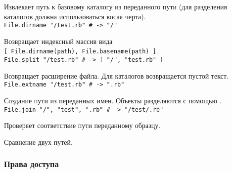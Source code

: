 \begin{methodlist}
  Извлекает путь к базовому каталогу из переданного пути (для разделения каталогов должна использоваться косая черта). 
  \\\verb!File.dirname "/test.rb" # -> "/"!

  Возвращает индексный массив вида 
  \\\verb![ File.dirname(path), File.basename(path) ]!. 
  \\\verb!File.split "/test.rb" # -> [ "/", "test.rb" ]!

  Возвращает расширение файла. Для каталогов возвращается пустой текст.
  \\\verb!File.extname "/test.rb" # -> ".rb"!

  Создание пути из переданных имен. Объекты разделяются с помощью . 
  \\\verb!File.join "/", "test", ".rb" # -> "/test/.rb"!

  Проверяет соответствие пути переданному образцу.

  Сравнение двух путей. 
\end{methodlist}

\subsubsection*{Права доступа}

